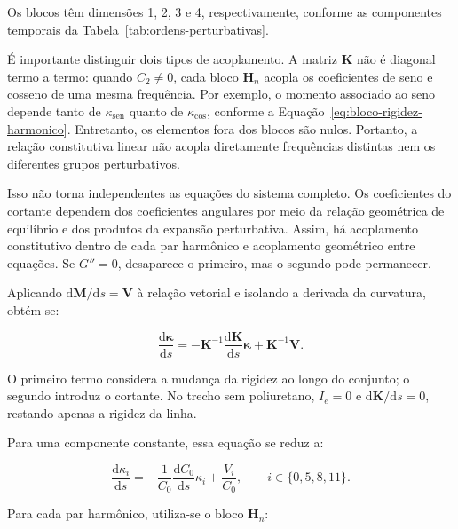 \documentclass[arial,centeredequations,english,brazilian,oneside,section=TITLE]{ifes8}
\begin{document}
Os blocos têm dimensões 1, 2, 3 e 4, respectivamente, conforme as componentes
temporais da Tabela~\ref{tab:ordens-perturbativas}.

É importante distinguir dois tipos de acoplamento. A matriz $\mathbf K$ não é
diagonal termo a termo: quando $C_2\neq0$, cada bloco $\mathbf H_n$ acopla os
coeficientes de seno e cosseno de uma mesma frequência. Por exemplo, o momento
associado ao seno depende tanto de $\kappa_{\mathrm{sen}}$ quanto de
$\kappa_{\mathrm{cos}}$, conforme a
Equação~\eqref{eq:bloco-rigidez-harmonico}. Entretanto, os elementos fora dos
blocos são nulos. Portanto, a relação constitutiva linear não acopla diretamente
frequências distintas nem os diferentes grupos perturbativos.

Isso não torna independentes as equações do sistema completo. Os coeficientes
do cortante dependem dos coeficientes angulares por meio da relação geométrica
de equilíbrio e dos produtos da expansão perturbativa. Assim, há acoplamento
constitutivo dentro de cada par harmônico e acoplamento geométrico entre
equações. Se $G''=0$, desaparece o primeiro, mas o segundo pode permanecer.

Aplicando $\mathrm{d}\boldsymbol M/\mathrm{d}s=\boldsymbol V$ à relação
vetorial e isolando a derivada da curvatura, obtém-se:

\begin{equation}
  \frac{\mathrm{d}\boldsymbol\kappa}{\mathrm{d}s}
  =-\mathbf K^{-1}\frac{\mathrm{d}\mathbf K}{\mathrm{d}s}
    \boldsymbol\kappa+\mathbf K^{-1}\boldsymbol V.
  \label{eq:governo-linear-vetorial}
\end{equation}

O primeiro termo considera a mudança da rigidez ao longo do conjunto; o segundo
introduz o cortante. No trecho sem poliuretano, $I_e=0$ e
$\mathrm{d}\mathbf K/\mathrm{d}s=0$, restando apenas a rigidez da linha.

Para uma componente constante, essa equação se reduz a:

\begin{equation}
  \frac{\mathrm{d}\kappa_i}{\mathrm{d}s}
  =-\frac{1}{C_0}\frac{\mathrm{d}C_0}{\mathrm{d}s}\kappa_i
    +\frac{V_i}{C_0},\qquad i\in\{0,5,8,11\}.
  \label{eq:governo-linear-componente-constante}
\end{equation}

Para cada par harmônico, utiliza-se o bloco $\mathbf H_n$:
\end{document}
